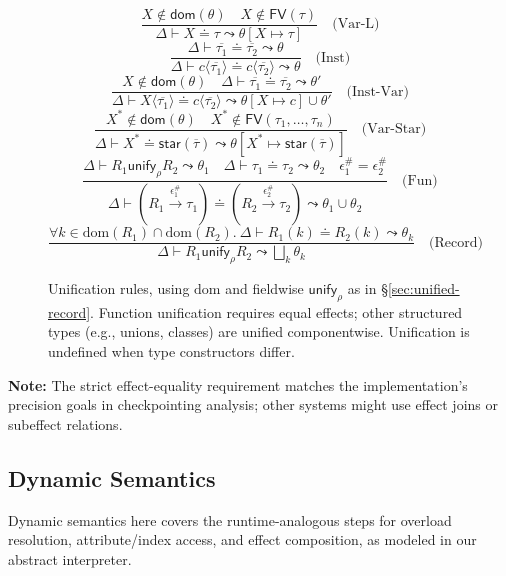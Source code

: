 \begin{figure*}[t]
\centering
\[
\frac{X \notin \mathsf{dom}(\theta) \quad X \notin \mathsf{FV}(\tau)}
     {\Delta \vdash X \doteq \tau \leadsto \theta[X \mapsto \tau]} \quad \text{(Var-L)}
\]
\[
\frac{\Delta \vdash \overline{\tau_1} \doteq \overline{\tau_2} \leadsto \theta}
     {\Delta \vdash c\langle\overline{\tau_1}\rangle \doteq c\langle\overline{\tau_2}\rangle \leadsto \theta} \quad \text{(Inst)}
\]
\[
\frac{X \notin \mathsf{dom}(\theta) \quad \Delta \vdash \overline{\tau_1} \doteq \overline{\tau_2} \leadsto \theta'}
     {\Delta \vdash X\langle\overline{\tau_1}\rangle \doteq c\langle\overline{\tau_2}\rangle \leadsto \theta[X \mapsto c] \cup \theta'} \quad \text{(Inst-Var)}
\]
\[
\frac{X^* \notin \mathsf{dom}(\theta) \quad X^* \notin \mathsf{FV}(\tau_1, \ldots, \tau_n)}
     {\Delta \vdash X^* \doteq \mathsf{star}(\overline{\tau}) \leadsto \theta[X^* \mapsto \mathsf{star}(\overline{\tau})]} \quad \text{(Var-Star)}
\]
\[
\frac{\Delta \vdash R_1 \mathrel{\mathsf{unify}_{\rho}} R_2 \leadsto \theta_1 \quad \Delta \vdash \tau_1 \doteq \tau_2 \leadsto \theta_2 \quad \epsilon^\#_1 = \epsilon^\#_2}
     {\Delta \vdash (R_1 \xrightarrow{\epsilon^\#_1} \tau_1) \doteq (R_2 \xrightarrow{\epsilon^\#_2} \tau_2) \leadsto \theta_1 \cup \theta_2} \quad \text{(Fun)}
\]
\[
\frac{\forall k \in \mathrm{dom}(R_1) \cap \mathrm{dom}(R_2).\ \Delta \vdash R_1(k) \doteq R_2(k) \leadsto \theta_k}
     {\Delta \vdash R_1 \mathrel{\mathsf{unify}_{\rho}} R_2 \leadsto \bigsqcup_k \theta_k} \quad \text{(Record)}
\]
\caption{Unification rules, using $\mathrm{dom}$ and fieldwise $\mathsf{unify}_{\rho}$ as in \S\ref{sec:unified-record}. Function unification requires equal effects; other structured types (e.g., unions, classes) are unified componentwise. Unification is undefined when type constructors differ.}
\label{fig:unification}
\end{figure*}

\noindent\textbf{Note:} The strict effect-equality requirement matches the implementation’s precision goals in checkpointing analysis; other systems might use effect joins or subeffect relations.

\subsection{Dynamic Semantics}

Dynamic semantics here covers the runtime-analogous steps for overload resolution, attribute/index access, and effect composition, as modeled in our abstract interpreter.

